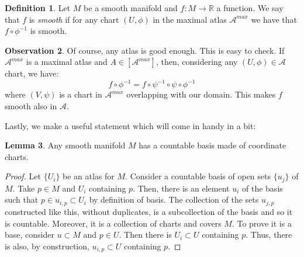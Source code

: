 \documentclass[12pt,a4paper]{report}
\theoremstyle{definition}
\newtheorem{Def}{Definition}[chapter]
\theoremstyle{Theorem}
\newtheorem{Lm}[Def]{Lemma}
\theoremstyle{break}
\theoremstyle{definition}
\newtheorem{Obs}[Def]{Observation}
\begin{document}
		\begin{Def}
			Let $M$ be a smooth manifold and $f:M\rightarrow\mathbb{R}$ a function. We say that $f$ is \textit{smooth} if for any chart $(U,\phi)$ in the maximal atlas $\mathcal{A}^{max}$ we have that
			$f\circ \phi^{-1}$ is smooth.
		\end{Def}
		\begin{Obs}
			Of course, any atlas is good enough. This is easy to check. If $\mathcal{A}^{max}$ is a maximal atlas and $A\in[\mathcal{A}^{max}]$, then, considering any $(U,\phi)\in \mathcal{A}$ chart, we have:
			$$f\circ \phi^{-1}=f\circ \psi^{-1}\circ \psi\circ \phi^{-1}$$
			where $(V,\psi)$ is a chart in $\mathcal{A}^{max}$ overlapping with our domain. This makes $f$ smooth also in $\mathcal{A}$.
		\end{Obs}
		Lastly, we make a useful statement which will come in handy in a bit:
		\begin{Lm}
			Any smooth manifold $M$ has a countable basis made of coordinate charts.
		\end{Lm}
		\begin{proof}
			Let $\{U_i\}$ be an atlas for $M$. Consider a countable basis of open sets $\{u_j\}$ of $M$. Take $p\in M$ and $U_i$ containing $p$. Then, there is an element $u_i$ of the basis such that $p\in u_{i,p}\subset U_{i}$ by definition of basis. The collection of the sets $u_{j,p}$ constructed like this, without duplicates, is a subcollection of the basis and so it is countable. Moreover, it is a collection of charts and covers $M$. To prove it is a base, consider $u\subset M$ and $p\in U$. Then there is $U_i\subset U$ containing $p$. Thus, there is also, by construction, $u_{i,p}\subset U$ containing $p$.
		\end{proof}
\end{document}
